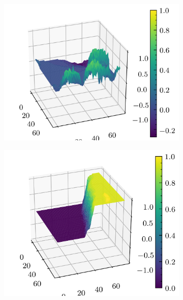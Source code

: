 \documentclass[../document.tex]{subfiles}
\begin{document}
\begin{figure}[H]
\begin{subfigure}[b]{0.19\textwidth}
        \includegraphics[width=\linewidth]{../img/5/quarry/worst/patch-3d-2.png}
    \end{subfigure}
    \begin{subfigure}[b]{0.19\textwidth}
        \includegraphics[width=\linewidth]{../img/5/quarry/worst/patch-3d-3.png}
    \end{subfigure}  
    \begin{subfigure}[b]{0.19\textwidth}

\end{subfigure}
\end{figure}
\end{document}
